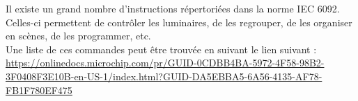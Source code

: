 Il existe un grand nombre d'instructions répertoriées dans la norme IEC 6092. Celles-ci permettent de contrôler les luminaires, de les regrouper, de les organiser en scènes, de les programmer, etc.\\ Une liste de ces commandes peut être trouvée en suivant le lien suivant : \url{https://onlinedocs.microchip.com/pr/GUID-0CDBB4BA-5972-4F58-98B2-3F0408F3E10B-en-US-1/index.html?GUID-DA5EBBA5-6A56-4135-AF78-FB1F780EF475}

